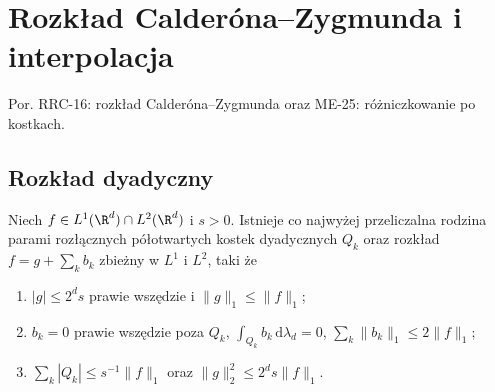 
\section{Rozkład Calderóna--Zygmunda i interpolacja}
\label{sec:dt-calderon-zygmund}
\providecommand{\atlasref}[2]{#2}
Por. \atlasref{PDE-16::lem:pde16-cz-decomp}{RRC-16: rozkład Calderóna--Zygmunda}
oraz \atlasref{ME-25::cor:cubes-differentiation-25}{ME-25: różniczkowanie po kostkach}.
\subsection{Rozkład dyadyczny}
\begin{lemat}
\label{lem:dt-cz-cz-decomp}
Niech $f\in L^1(\R^d)\cap L^2(\R^d)$ i $s>0$. Istnieje
co najwyżej przeliczalna rodzina parami rozłącznych półotwartych
kostek dyadycznych $Q_k$ oraz rozkład $f=g+\sum_k b_k$
zbieżny w $L^1$ i $L^2$, taki że
\begin{enumerate}[label=(\roman*)]
\item $|g|\le 2^ds$ prawie wszędzie i $\|g\|_1\le\|f\|_1$;
\item $b_k=0$ prawie wszędzie poza $Q_k$,
 $\int_{Q_k} b_k\,\mathrm d\lambda_d=0$,
 $\sum_k\|b_k\|_1\le2\|f\|_1$;
\item $\sum_k|Q_k|\le s^{-1}\|f\|_1$ oraz
 $\|g\|_2^2\le 2^ds\|f\|_1$.
\end{enumerate}
\end{lemat}
